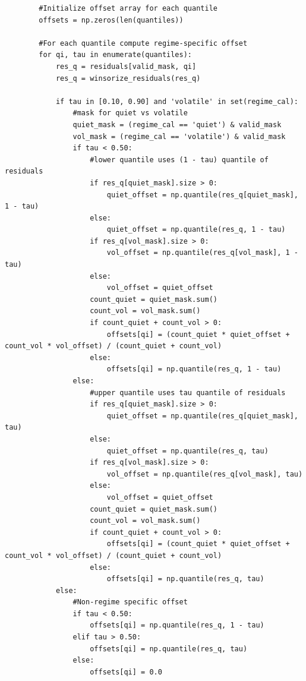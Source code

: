 \documentclass[
  a4paper,
  DIV=11,
  numbers=noendperiod]{scrreprt}
\begin{document}
\begin{verbatim}
        #Initialize offset array for each quantile
        offsets = np.zeros(len(quantiles))

        #For each quantile compute regime‑specific offset
        for qi, tau in enumerate(quantiles):
            res_q = residuals[valid_mask, qi]
            res_q = winsorize_residuals(res_q)

            if tau in [0.10, 0.90] and 'volatile' in set(regime_cal):
                #mask for quiet vs volatile
                quiet_mask = (regime_cal == 'quiet') & valid_mask
                vol_mask = (regime_cal == 'volatile') & valid_mask
                if tau < 0.50:
                    #lower quantile uses (1 - tau) quantile of residuals
                    if res_q[quiet_mask].size > 0:
                        quiet_offset = np.quantile(res_q[quiet_mask], 1 - tau)
                    else:
                        quiet_offset = np.quantile(res_q, 1 - tau)
                    if res_q[vol_mask].size > 0:
                        vol_offset = np.quantile(res_q[vol_mask], 1 - tau)
                    else:
                        vol_offset = quiet_offset
                    count_quiet = quiet_mask.sum()
                    count_vol = vol_mask.sum()
                    if count_quiet + count_vol > 0:
                        offsets[qi] = (count_quiet * quiet_offset + count_vol * vol_offset) / (count_quiet + count_vol)
                    else:
                        offsets[qi] = np.quantile(res_q, 1 - tau)
                else:
                    #upper quantile uses tau quantile of residuals
                    if res_q[quiet_mask].size > 0:
                        quiet_offset = np.quantile(res_q[quiet_mask], tau)
                    else:
                        quiet_offset = np.quantile(res_q, tau)
                    if res_q[vol_mask].size > 0:
                        vol_offset = np.quantile(res_q[vol_mask], tau)
                    else:
                        vol_offset = quiet_offset
                    count_quiet = quiet_mask.sum()
                    count_vol = vol_mask.sum()
                    if count_quiet + count_vol > 0:
                        offsets[qi] = (count_quiet * quiet_offset + count_vol * vol_offset) / (count_quiet + count_vol)
                    else:
                        offsets[qi] = np.quantile(res_q, tau)
            else:
                #Non‑regime specific offset
                if tau < 0.50:
                    offsets[qi] = np.quantile(res_q, 1 - tau)
                elif tau > 0.50:
                    offsets[qi] = np.quantile(res_q, tau)
                else:
                    offsets[qi] = 0.0


\end{verbatim}
\end{document}
